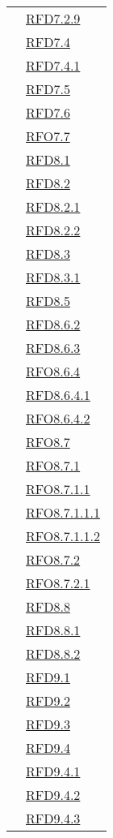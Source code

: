 \begin{longtable}{|>{\centering}m{5cm}|m{5cm}<{\centering}|}
& \hyperlink{RFD7.2.9}{RFD7.2.9}\\
& \hyperlink{RFD7.4}{RFD7.4}\\
& \hyperlink{RFD7.4.1}{RFD7.4.1}\\
& \hyperlink{RFD7.5}{RFD7.5}\\
& \hyperlink{RFD7.6}{RFD7.6}\\
& \hyperlink{RFO7.7}{RFO7.7}\\
& \hyperlink{RFD8.1}{RFD8.1}\\
& \hyperlink{RFD8.2}{RFD8.2}\\
& \hyperlink{RFD8.2.1}{RFD8.2.1}\\
& \hyperlink{RFD8.2.2}{RFD8.2.2}\\
& \hyperlink{RFD8.3}{RFD8.3}\\
& \hyperlink{RFD8.3.1}{RFD8.3.1}\\
& \hyperlink{RFD8.5}{RFD8.5}\\
& \hyperlink{RFD8.6.2}{RFD8.6.2}\\
& \hyperlink{RFD8.6.3}{RFD8.6.3}\\
& \hyperlink{RFO8.6.4}{RFO8.6.4}\\
& \hyperlink{RFD8.6.4.1}{RFD8.6.4.1}\\
& \hyperlink{RFO8.6.4.2}{RFO8.6.4.2}\\
& \hyperlink{RFO8.7}{RFO8.7}\\
& \hyperlink{RFO8.7.1}{RFO8.7.1}\\
& \hyperlink{RFO8.7.1.1}{RFO8.7.1.1}\\
& \hyperlink{RFO8.7.1.1.1}{RFO8.7.1.1.1}\\
& \hyperlink{RFO8.7.1.1.2}{RFO8.7.1.1.2}\\
& \hyperlink{RFO8.7.2}{RFO8.7.2}\\
& \hyperlink{RFO8.7.2.1}{RFO8.7.2.1}\\
& \hyperlink{RFD8.8}{RFD8.8}\\
& \hyperlink{RFD8.8.1}{RFD8.8.1}\\
& \hyperlink{RFD8.8.2}{RFD8.8.2}\\
& \hyperlink{RFD9.1}{RFD9.1}\\
& \hyperlink{RFD9.2}{RFD9.2}\\
& \hyperlink{RFD9.3}{RFD9.3}\\
& \hyperlink{RFD9.4}{RFD9.4}\\
& \hyperlink{RFD9.4.1}{RFD9.4.1}\\
& \hyperlink{RFD9.4.2}{RFD9.4.2}\\
& \hyperlink{RFD9.4.3}{RFD9.4.3}\\

\end{longtable}
